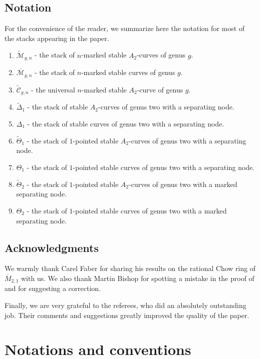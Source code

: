 \documentclass[a4paper, 10pt]{amsart}
\numberwithin{equation}{section}
\numberwithin{subsection}{section}
\theoremstyle{definition}
\theoremstyle{remark}
\renewcommand{\mathcal}{\mathscr}
\newcommand\cM{\mathcal{M}} \newcommand\cN{\mathcal{N}}
\newcommand{\Mbar}{\overline{\cM}}
\newcommand{\Mtilde}{\widetilde{\mathcal M}}
\newcommand{\Ctilde}{\widetilde{\mathcal C}}
\newcommand{\Dtilde}{\widetilde{\Delta}}
\newcommand{\ThTilde}{\widetilde{\Theta}}
\begin{document}
	\subsection*{Notation}
	For the convenience of the reader, we summarize here the notation for most of the stacks appearing in the paper.
	\begin{enumerate}
		\item $\Mtilde_{g,n}$ - the stack of $n$-marked stable $A_2$-curves of genus $g$.
		\item $\Mbar_{g,n}$ - the stack of $n$-marked stable curves of genus $g$.
		\item $\Ctilde_{g,n}$ - the universal $n$-marked stable $A_2$-curve of genus $g$.
		\item $\Dtilde_1$ - the stack of stable $A_2$-curves of genus two with a separating node.
		\item $\Delta_1$ - the stack of stable curves of genus two with a separating node.
		\item $\ThTilde_1$ - the stack of $1$-pointed stable $A_2$-curves of genus two with a separating node.
		\item $\Theta_1$ - the stack of $1$-pointed stable curves of genus two with a separating node.
		\item $\ThTilde_2$ - the stack of $1$-pointed stable $A_2$-curves of genus two with a marked separating node.
		\item $\Theta_2$ - the stack of $1$-pointed stable curves of genus two with a marked separating node.
	\end{enumerate}
	
	\subsection*{Acknowledgments}
	We warmly thank Carel Faber for sharing his results on the rational Chow ring of $\overline{M}_{2,1}$ with us. We also thank Martin Bishop for spotting a mistake in the proof of  and for suggesting a correction. 
	
	Finally, we are very grateful to the referees, who did an absolutely outstanding job. Their comments and suggestions greatly improved the quality of the paper.
	
	\section*{Notations and conventions}
	
\end{document}
